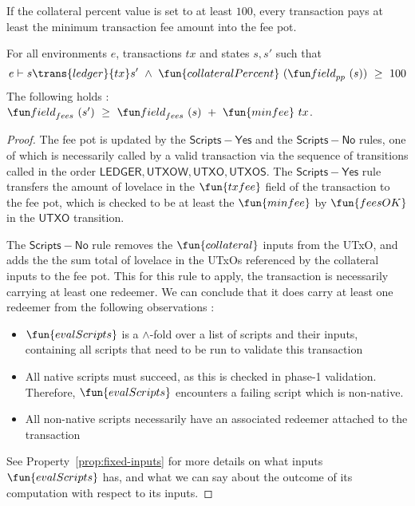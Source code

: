 \begin{property}
  \label{prop:pay-fees}

If the collateral percent value is set to at least $100$, every transaction pays
at least the minimum transaction fee amount into the fee pot.

\begin{lemma}
  For all environments $e$, transactions $tx$ and states $s, s'$ such that
  \begin{equation*}
    e\vdash s\trans{ledger}{tx}s'~\wedge~\fun{collateralPercent}~(\field_{pp}~(s))~\geq~100
  \end{equation*}
  The following holds : $\field_{fees}~(s')~\geq~\field_{fees}~(s)~+~\fun{minfee}~{tx}$.
\end{lemma}
\begin{proof}
  The fee pot is updated by the $\mathsf{Scripts{-}Yes}$ and the $\mathsf{Scripts{-}No}$
  rules, one of which is necessarily called by a valid transaction via the sequence
  of transitions called in the order $\mathsf{LEDGER}, \mathsf{UTXOW}, \mathsf{UTXO}, \mathsf{UTXOS}$.
  The $\mathsf{Scripts{-}Yes}$ rule transfers the amount of lovelace in the $\fun{txfee}$ field of the
  transaction to the fee pot, which is checked to be at least the $\fun{minfee}$
  by $\fun{feesOK}$ in the $\mathsf{UTXO}$ transition.

  The $\mathsf{Scripts{-}No}$ rule removes the $\fun{collateral}$ inputs from the
  UTxO, and adds the the sum total of lovelace in the UTxOs referenced by
  the collateral inputs to the fee pot. This for this rule to apply, the
  transaction is necessarily carrying at least one redeemer. We can conclude that it
  does carry at least one redeemer from the following observations :
  \begin{itemize}
    \item $\fun{evalScripts}$ is a $\wedge$-fold over a list of scripts and
    their inputs, containing all scripts that need to be run to validate this transaction
    \item All native scripts must succeed, as this is checked in phase-1 validation. Therefore,
    $\fun{evalScripts}$ encounters a failing script which is non-native.
    \item All non-native scripts necessarily have an associated redeemer attached to the
    transaction
  \end{itemize}
  See Property~\ref{prop:fixed-inputs} for more details on what inputs $\fun{evalScripts}$ has,
  and what we can say about the outcome of its computation with respect to its inputs.


\end{proof}
\end{property}
